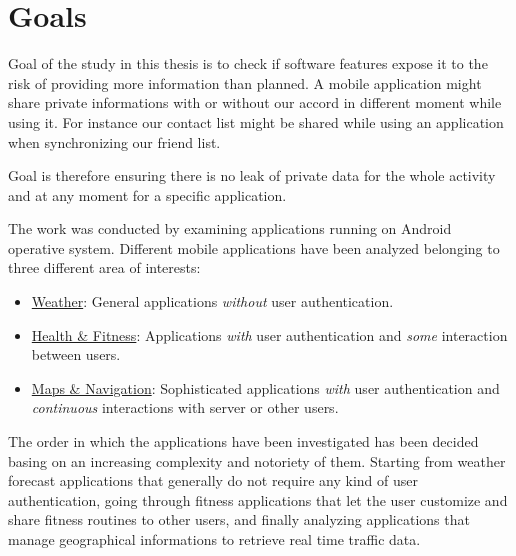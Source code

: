 	\section{Goals}
		\par Goal of the study in this thesis is to check if software features expose it to the risk of providing more information than planned. \newline
		A mobile application might share private informations with or without our accord in different moment while using it. For instance our contact list might be shared while using an application when synchronizing our friend list.
		\par Goal is therefore ensuring there is no leak of private data for the whole activity and at any moment for a specific application.
		\newline
		\par The work was conducted by examining applications running on Android operative system. Different mobile applications have been analyzed belonging to three different area of interests:
		\begin{itemize}
			\item \underline{Weather}: General applications \textit{without} user authentication.
			\item \underline{Health \& Fitness}: Applications \textit{with} user authentication and \textit{some} interaction between users.
			\item \underline{Maps \& Navigation}: Sophisticated applications  \textit{with} user authentication and \textit{continuous} interactions with server or other users.
		\end{itemize}
		\par The order in which the applications have been investigated has been decided basing on an increasing complexity and notoriety of them. Starting from weather forecast applications that generally do not require any kind of user authentication, going through fitness applications that let the user customize and share fitness routines to other users, and finally analyzing applications that manage geographical informations to retrieve real time traffic data.
		 
